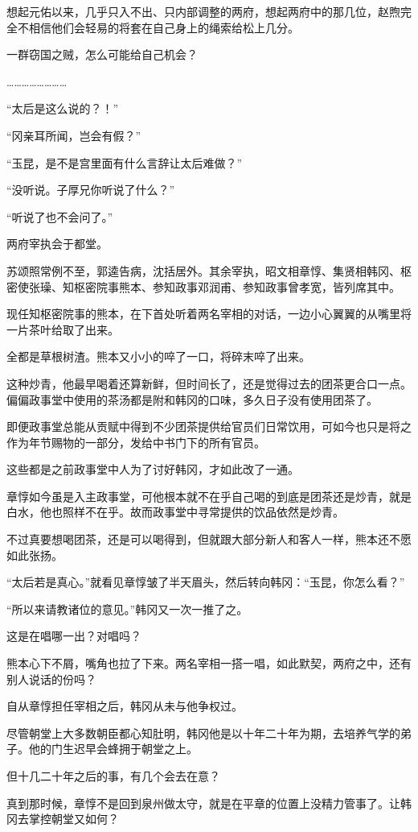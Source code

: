 想起元佑以来，几乎只入不出、只内部调整的两府，想起两府中的那几位，赵煦完全不相信他们会轻易的将套在自己身上的绳索给松上几分。

一群窃国之贼，怎么可能给自己机会？

……………………

“太后是这么说的？！”

“冈亲耳所闻，岂会有假？”

“玉昆，是不是宫里面有什么言辞让太后难做？”

“没听说。子厚兄你听说了什么？”

“听说了也不会问了。”

两府宰执会于都堂。

苏颂照常例不至，郭逵告病，沈括居外。其余宰执，昭文相章惇、集贤相韩冈、枢密使张璪、知枢密院事熊本、参知政事邓润甫、参知政事曾孝宽，皆列席其中。

现任知枢密院事的熊本，在下首处听着两名宰相的对话，一边小心翼翼的从嘴里将一片茶叶给取了出来。

全都是草根树渣。熊本又小小的啐了一口，将碎末啐了出来。

这种炒青，他最早喝着还算新鲜，但时间长了，还是觉得过去的团茶更合口一点。偏偏政事堂中使用的茶汤都是附和韩冈的口味，多久日子没有使用团茶了。

即便政事堂总能从贡赋中得到不少团茶提供给官员们日常饮用，可如今也只是将之作为年节赐物的一部分，发给中书门下的所有官员。

这些都是之前政事堂中人为了讨好韩冈，才如此改了一通。

章惇如今虽是入主政事堂，可他根本就不在乎自己喝的到底是团茶还是炒青，就是白水，他也照样不在乎。故而政事堂中寻常提供的饮品依然是炒青。

不过真要想喝团茶，还是可以喝得到，但就跟大部分新人和客人一样，熊本还不愿如此张扬。

“太后若是真心。”就看见章惇皱了半天眉头，然后转向韩冈：“玉昆，你怎么看？”

“所以来请教诸位的意见。”韩冈又一次一推了之。

这是在唱哪一出？对唱吗？

熊本心下不屑，嘴角也拉了下来。两名宰相一搭一唱，如此默契，两府之中，还有别人说话的份吗？

自从章惇担任宰相之后，韩冈从未与他争权过。

尽管朝堂上大多数朝臣都心知肚明，韩冈他是以十年二十年为期，去培养气学的弟子。他的门生迟早会蜂拥于朝堂之上。

但十几二十年之后的事，有几个会去在意？

真到那时候，章惇不是回到泉州做太守，就是在平章的位置上没精力管事了。让韩冈去掌控朝堂又如何？

